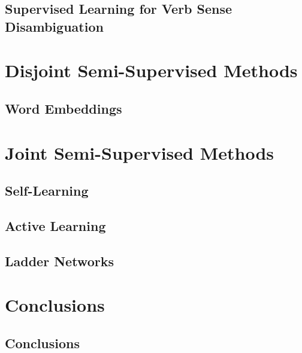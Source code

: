 \documentclass[
11pt, %
english, %
onehalfspacing, %
nolistspacing, %
headsepline, %
consistentlayout, %
]{MastersDoctoralThesis} %
\begin{document}
\chapter{Supervised Learning for Verb Sense
Disambiguation}\label{chapter:supervised}


\part{Disjoint Semi-Supervised Methods} 

\chapter{Word Embeddings}\label{chapter:embeddings}


\part{Joint Semi-Supervised Methods}

\chapter{Self-Learning}\label{chapter:self-learning}


\chapter{Active Learning}\label{chapter:active}


\chapter{Ladder Networks}\label{chapter:ladder}


\part{Conclusions}\label{chapter:conclusions}

\chapter{Conclusions}


\end{document}
